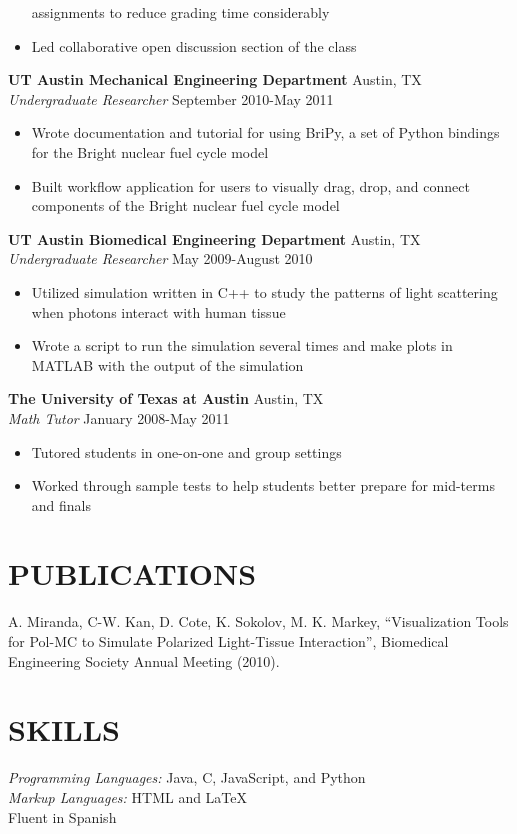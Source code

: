 \documentclass[line,margin,letterpaper]{res}
\begin{document}
\begin{resume}
\begin{itemize}
    assignments to reduce grading time considerably
    \item Led collaborative open discussion section of the class
  \end{itemize}
  {\bf UT Austin Mechanical Engineering Department} \hfill Austin, TX \\
  \emph{Undergraduate Researcher} \hfill September 2010-May 2011
  \begin{itemize} \itemsep -2pt
    \item Wrote documentation and tutorial for using BriPy, a set of Python
    bindings for the Bright nuclear fuel cycle model
    \item Built workflow application for users to visually drag, drop, and 
    connect components of the Bright nuclear fuel cycle model
  \end{itemize}
  {\bf UT Austin Biomedical Engineering Department} \hfill Austin, TX \\
  \emph{Undergraduate Researcher} \hfill May 2009-August 2010
  \begin{itemize} \itemsep -2pt
    \item Utilized simulation written in C++ to study the patterns of light 
    scattering when photons interact with human tissue
    \item Wrote a script to run the simulation several times and make plots in 
    MATLAB with the output of the simulation
  \end{itemize}
  {\bf The University of Texas at Austin} \hfill Austin, TX \\
  \emph{Math Tutor} \hfill January 2008-May 2011
  \begin{itemize} \itemsep -2pt
    \item Tutored students in one-on-one and group settings
    \item Worked through sample tests to help students better prepare for 
    mid-terms and finals
  \end{itemize}
 
\section{PUBLICATIONS} 
  A. Miranda, C-W. Kan, D. Cote, K. Sokolov, M. K. Markey, ``Visualization 
  Tools for Pol-MC to Simulate Polarized Light-Tissue Interaction'', 
  Biomedical Engineering Society Annual Meeting (2010).

\section{SKILLS}
  \emph{Programming Languages:} Java, C, JavaScript, and Python \\
  \emph{Markup Languages:} HTML and \LaTeX \\
  Fluent in Spanish

\end{resume}
\end{document}
